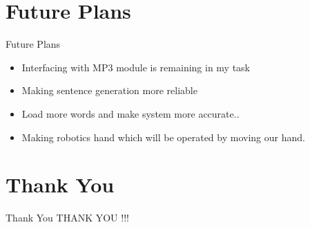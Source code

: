 \documentclass[10pt, a4paper]{beamer}
\begin{document}
\section{Future Plans}
\begin{frame}{Future Plans}
	\begin{itemize}
		\item Interfacing with MP3 module is remaining in my task
		\item Making sentence generation more reliable
		\item Load more words and make system more accurate..
		\item Making robotics hand which will be operated by moving our hand. 
	\end{itemize}
\end{frame}


\section{Thank You}
\begin{frame}{Thank You}
	\centering THANK YOU !!!
\end{frame}
\end{document}
